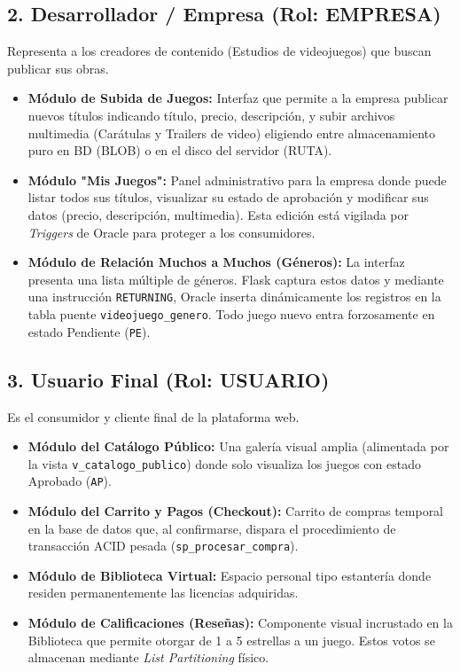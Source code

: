 \documentclass[12pt,a4paper]{article}
\begin{document}
\subsection{2. Desarrollador / Empresa (Rol: EMPRESA)}
Representa a los creadores de contenido (Estudios de videojuegos) que buscan publicar sus obras.
\begin{itemize}
    \item \textbf{Módulo de Subida de Juegos:} Interfaz que permite a la empresa publicar nuevos títulos indicando título, precio, descripción, y subir archivos multimedia (Carátulas y Trailers de video) eligiendo entre almacenamiento puro en BD (BLOB) o en el disco del servidor (RUTA).
    \item \textbf{Módulo "Mis Juegos":} Panel administrativo para la empresa donde puede listar todos sus títulos, visualizar su estado de aprobación y modificar sus datos (precio, descripción, multimedia). Esta edición está vigilada por \textit{Triggers} de Oracle para proteger a los consumidores. 
    \item \textbf{Módulo de Relación Muchos a Muchos (Géneros):} La interfaz presenta una lista múltiple de géneros. Flask captura estos datos y mediante una instrucción \texttt{RETURNING}, Oracle inserta dinámicamente los registros en la tabla puente \texttt{videojuego\_genero}. Todo juego nuevo entra forzosamente en estado Pendiente (\texttt{PE}).
\end{itemize}

\subsection{3. Usuario Final (Rol: USUARIO)}
Es el consumidor y cliente final de la plataforma web.
\begin{itemize}
    \item \textbf{Módulo del Catálogo Público:} Una galería visual amplia (alimentada por la vista \texttt{v\_catalogo\_publico}) donde solo visualiza los juegos con estado Aprobado (\texttt{AP}).
    \item \textbf{Módulo del Carrito y Pagos (Checkout):} Carrito de compras temporal en la base de datos que, al confirmarse, dispara el procedimiento de transacción ACID pesada (\texttt{sp\_procesar\_compra}).
    \item \textbf{Módulo de Biblioteca Virtual:} Espacio personal tipo estantería donde residen permanentemente las licencias adquiridas.
    \item \textbf{Módulo de Calificaciones (Reseñas):} Componente visual incrustado en la Biblioteca que permite otorgar de 1 a 5 estrellas a un juego. Estos votos se almacenan mediante \textit{List Partitioning} físico.
\end{itemize}
\end{document}
